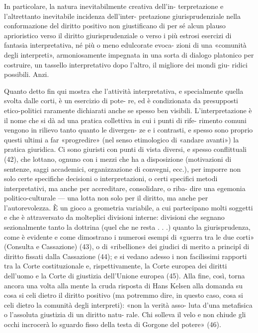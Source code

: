 In  particolare,  la  natura  inevitabilmente  creativa  dell’in-
terpretazione  e  l’altrettanto  inevitabile  incidenza  dell’inter-
pretazione  giurisprudenziale  nella  conformazione  del  diritto positivo  non  giustificano  di  per  sé  alcun  plauso  aprioristico 
verso il diritto giurisprudenziale o verso i più estrosi esercizi 
di  fantasia  interpretativa,  né  più  o  meno  edulcorate  evoca-
zioni  di  una  «comunità  degli  interpreti»,  armoniosamente 
impegnata in una sorta di dialogo platonico per costruire, un 
tassello interpretativo dopo l’altro, il migliore dei mondi giu-
ridici possibili. Anzi.  

Quanto  detto  fin  qui  mostra  che  l’attività  interpretativa,  e 
specialmente quella svolta dalle corti, è un esercizio di pote-
re,  ed  è  condizionata  da  presupposti  etico-politici  raramente 
dichiarati  anche  se  spesso  ben  visibili.  L’interpretazione  è  il 
nome che si dà ad una pratica collettiva in cui i punti di rife-
rimento comuni vengono in rilievo tanto quanto le divergen-
ze  e  i  contrasti,  e  spesso  sono  proprio  questi  ultimi  a  far 
«progredire»  (nel  senso  etimologico  di  «andare  avanti»)  la 
pratica giuridica. Ci sono giuristi con punti di vista diversi, e 
spesso conflittuali (42), che lottano, ognuno con i mezzi che 
ha a disposizione (motivazioni di sentenze, saggi accademici, 
organizzazione di convegni, ecc.), per imporre non solo certe 
specifiche decisioni o interpretazioni, o certi specifici metodi 
interpretativi,  ma  anche  per  accreditare,  consolidare,  o  riba-
dire  una  egemonia  politico-culturale  —  una  lotta  non  solo 
per il diritto, ma anche per l’autorevolezza.  
È  un  gioco  a  geometria  variabile,  a  cui  partecipano  molti 
soggetti  e  che  è  attraversato  da  molteplici  divisioni  interne: 
divisioni  che  segnano  sezionalmente  tanto  la  dottrina  (quel 
che ne resta . . .) quanto la giurisprudenza, come è evidente e 
come  dimostrano  i  numerosi  esempi  di  «guerra  tra  le  due 
corti»  (Consulta  e  Cassazione)  (43),  o  di  «ribellione»  dei 
giudici di merito a principî di diritto fissati dalla Cassazione 
(44); e si vedano adesso i non facilissimi rapporti tra la Corte 
costituzionale  e,  rispettivamente,  la  Corte  europea  dei  diritti 
dell’uomo e la Corte di giustizia dell’Unione europea (45). 
Alla  fine,  così,  torna  ancora  una  volta  alla  mente  la  cruda 
risposta di Hans Kelsen alla domanda su cosa si celi dietro il 
diritto  positivo  (ma  potremmo  dire,  in  questo  caso,  cosa  si 
celi  dietro  la  comunità  degli  interpreti):  «non  la  verità  asso-
luta d’una metafisica o l’assoluta giustizia di un diritto natu-
rale.  Chi  solleva  il  velo  e  non  chiude  gli  occhi  incrocerà  lo 
sguardo fisso della testa di Gorgone del potere» (46). 